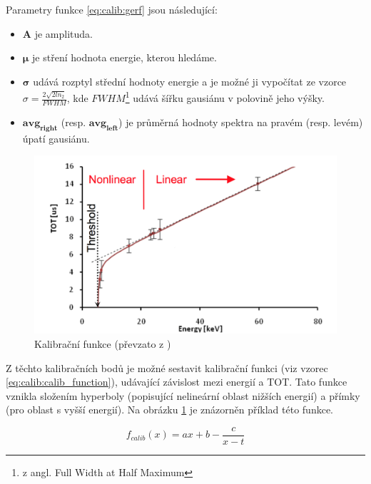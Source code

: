 Parametry funkce \ref{eq:calib:gerf} jsou následující:
\begin{itemize}
	\item $\mathbf{A}$ je amplituda.
	\item $\mathbf{\mu}$ je stření hodnota energie, kterou hledáme.
	\item $\mathbf{\sigma}$ udává rozptyl střední hodnoty energie a je možné ji vypočítat ze vzorce 
		$\sigma = \frac{2\sqrt{2ln_2}}{FWHM}$, kde $FWHM$\footnote{z angl. Full Width at Half Maximum} udává šířku gausiánu v polovině jeho výšky.
	\item $\mathbf{avg_{right}}$ (resp. $\mathbf{avg_{left}}$) je průměrná hodnoty spektra na pravém (resp. levém) úpatí gausiánu.
\end{itemize}
 
\begin{figure}[th]
	\begin{center}
		\includegraphics[width=13cm]{figures/calib_function.png}
		\caption{Kalibrační funkce (převzato z \cite{Jakubek2011S262})}
		\label{fig:calib:calib_function}
	\end{center}
\end{figure}

Z těchto kalibračních bodů je možné sestavit kalibrační funkci (viz vzorec \ref{eq:calib:calib_function}), udávající závislost mezi energií a TOT. Tato funkce vznikla složením hyperboly (popisující nelineární oblast nižších energií) a přímky (pro oblast s vyšší energií). Na obrázku \ref{fig:calib:calib_function} je znázorněn příklad této funkce.

\begin{equation}\label{eq:calib:calib_function}
	f_{calib}(x) = ax + b - \frac{c}{x-t}
\end{equation}

